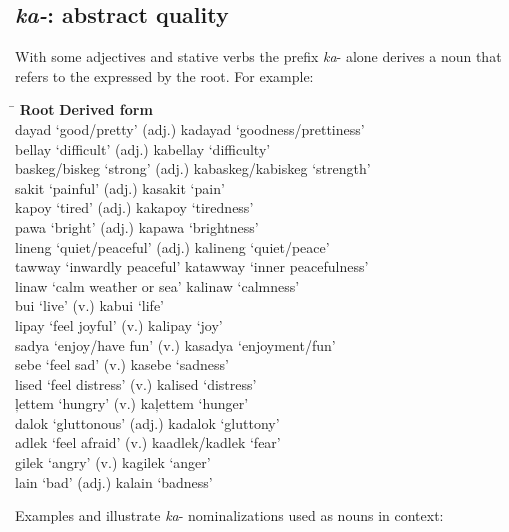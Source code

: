 \subsection{\textit{ka-}: abstract quality}
\label{sec:ka}

With some adjectives and stative verbs the prefix \textit{ka}{}- alone derives a noun that refers to the  expressed by the root. For example:

\ea
\label{ex:ka}
\begin{tabbing}
\hspace{6cm}  \= \kill
\textbf{Root} \> \textbf{Derived form} \\
dayad ‘good/pretty’ (adj.)  \>   kadayad ‘goodness/prettiness’ \\
bellay ‘difficult’ (adj.) \> kabellay ‘difficulty’ \\
baskeg/biskeg ‘strong’ (adj.) \> kabaskeg/kabiskeg ‘strength’ \\
sakit ‘painful’ (adj.) \> kasakit ‘pain’ \\
kapoy ‘tired’ (adj.) \> kakapoy ‘tiredness’ \\
pawa ‘bright’ (adj.) \> kapawa ‘brightness’ \\
lineng ‘quiet/peaceful’ (adj.) \> kalineng ‘quiet/peace’ \\
tawway ‘inwardly peaceful’ \> katawway ‘inner peacefulness’ \\
linaw ‘calm weather or sea' \> kalinaw ‘calmness’ \\
bui ‘live’ (v.) \> kabui ‘life’ \\
lipay ‘feel joyful’ (v.) \> kalipay ‘joy’ \\
sadya ‘enjoy/have fun’ (v.) \> kasadya ‘enjoyment/fun’ \\
sebe ‘feel sad’ (v.) \> kasebe ‘sadness’ \\
lised ‘feel distress’ (v.) \> kalised ‘distress’ \\
ļettem ‘hungry’ (v.) \> kaļettem ‘hunger’ \\
dalok ‘gluttonous’ (adj.) \> kadalok ‘gluttony’ \\
adlek ‘feel afraid’ (v.) \>  kaadlek/kadlek ‘fear’ \\
gilek ‘angry’ (v.) \> kagilek ‘anger’ \\
lain ‘bad’ (adj.) \> kalain ‘badness’
\end{tabbing}
\z

Examples  and  illustrate \textit{ka}{}- nominalizations used as nouns in context:

